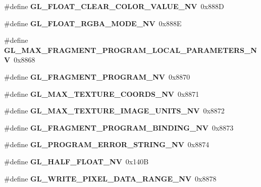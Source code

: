 \begin{DoxyCompactItemize}
\item 
\#define {\bfseries G\+L\+\_\+\+F\+L\+O\+A\+T\+\_\+\+C\+L\+E\+A\+R\+\_\+\+C\+O\+L\+O\+R\+\_\+\+V\+A\+L\+U\+E\+\_\+\+N\+V}~0x888\+D\label{_s_d_l__opengl_8h_a50347bada2fb52e79f637746919d42f6}

\item 
\#define {\bfseries G\+L\+\_\+\+F\+L\+O\+A\+T\+\_\+\+R\+G\+B\+A\+\_\+\+M\+O\+D\+E\+\_\+\+N\+V}~0x888\+E\label{_s_d_l__opengl_8h_ab02db357e1be6e3314b483f3e11dbc2c}

\item 
\#define {\bfseries G\+L\+\_\+\+M\+A\+X\+\_\+\+F\+R\+A\+G\+M\+E\+N\+T\+\_\+\+P\+R\+O\+G\+R\+A\+M\+\_\+\+L\+O\+C\+A\+L\+\_\+\+P\+A\+R\+A\+M\+E\+T\+E\+R\+S\+\_\+\+N\+V}~0x8868\label{_s_d_l__opengl_8h_a8a1628d90938a683ed20576ed195cc82}

\item 
\#define {\bfseries G\+L\+\_\+\+F\+R\+A\+G\+M\+E\+N\+T\+\_\+\+P\+R\+O\+G\+R\+A\+M\+\_\+\+N\+V}~0x8870\label{_s_d_l__opengl_8h_abbd63448f69924f0c2f93ec249dbe6d5}

\item 
\#define {\bfseries G\+L\+\_\+\+M\+A\+X\+\_\+\+T\+E\+X\+T\+U\+R\+E\+\_\+\+C\+O\+O\+R\+D\+S\+\_\+\+N\+V}~0x8871\label{_s_d_l__opengl_8h_a4a5bc19a15acd2179c765406805f26a1}

\item 
\#define {\bfseries G\+L\+\_\+\+M\+A\+X\+\_\+\+T\+E\+X\+T\+U\+R\+E\+\_\+\+I\+M\+A\+G\+E\+\_\+\+U\+N\+I\+T\+S\+\_\+\+N\+V}~0x8872\label{_s_d_l__opengl_8h_a8af9643787290034aed7729a47baa1c9}

\item 
\#define {\bfseries G\+L\+\_\+\+F\+R\+A\+G\+M\+E\+N\+T\+\_\+\+P\+R\+O\+G\+R\+A\+M\+\_\+\+B\+I\+N\+D\+I\+N\+G\+\_\+\+N\+V}~0x8873\label{_s_d_l__opengl_8h_a04cdfb866258d7332d7a5a90fb2ca7b1}

\item 
\#define {\bfseries G\+L\+\_\+\+P\+R\+O\+G\+R\+A\+M\+\_\+\+E\+R\+R\+O\+R\+\_\+\+S\+T\+R\+I\+N\+G\+\_\+\+N\+V}~0x8874\label{_s_d_l__opengl_8h_a8e3a12aaa4b6ed9d0dfeb5b5e4d85abf}

\item 
\#define {\bfseries G\+L\+\_\+\+H\+A\+L\+F\+\_\+\+F\+L\+O\+A\+T\+\_\+\+N\+V}~0x140\+B\label{_s_d_l__opengl_8h_a253eb425a04047d1ebef6212663edb40}

\item 
\#define {\bfseries G\+L\+\_\+\+W\+R\+I\+T\+E\+\_\+\+P\+I\+X\+E\+L\+\_\+\+D\+A\+T\+A\+\_\+\+R\+A\+N\+G\+E\+\_\+\+N\+V}~0x8878\label{_s_d_l__opengl_8h_a9c8addc67c3239f81d994fd594030b4e}


\end{DoxyCompactItemize}

